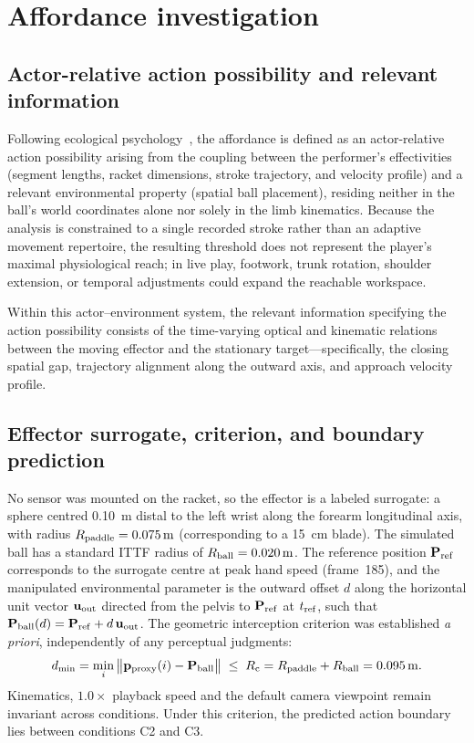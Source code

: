 \section{Affordance investigation}\label{sec:affordance}

\subsection{Actor-relative action possibility and relevant information}

Following ecological psychology~\cite{gibson1979}, the affordance is defined as an actor-relative action possibility arising from the coupling between the performer's effectivities (segment lengths, racket dimensions, stroke trajectory, and velocity profile) and a relevant environmental property (spatial ball placement), residing neither in the ball's world coordinates alone nor solely in the limb kinematics. Because the analysis is constrained to a single recorded stroke rather than an adaptive movement repertoire, the resulting threshold does not represent the player's maximal physiological reach; in live play, footwork, trunk rotation, shoulder extension, or temporal adjustments could expand the reachable workspace.

Within this actor--environment system, the relevant information specifying the action possibility consists of the time-varying optical and kinematic relations between the moving effector and the stationary target—specifically, the closing spatial gap, trajectory alignment along the outward axis, and approach velocity profile.

\subsection{Effector surrogate, criterion, and boundary prediction}
No sensor was mounted on the racket, so the effector is a labeled surrogate: a sphere centred \SI{0.10}{\meter} distal to the left wrist along the forearm longitudinal axis, with radius $R_{\mathrm{paddle}}=\SI{0.075}{\meter}$ (corresponding to a \SI{15}{\centi\meter} blade). The simulated ball has a standard ITTF radius of $R_{\mathrm{ball}}=\SI{0.020}{\meter}$. The reference position $\mathbf{P}_{\mathrm{ref}}$ corresponds to the surrogate centre at peak hand speed (frame~185), and the manipulated environmental parameter is the outward offset $d$ along the horizontal unit vector $\mathbf{u}_{\mathrm{out}}$ directed from the pelvis to $\mathbf{P}_{\mathrm{ref}}$ at $t_{\mathrm{ref}}$, such that $\mathbf{P}_{\mathrm{ball}}(d)=\mathbf{P}_{\mathrm{ref}}+d\,\mathbf{u}_{\mathrm{out}}$. The geometric interception criterion was established \emph{a priori}, independently of any perceptual judgments:
\begin{equation}
    d_{\mathrm{min}}=\min_i\,\bigl\lVert \mathbf{p}_{\mathrm{proxy}}(i)-\mathbf{P}_{\mathrm{ball}}\bigr\rVert \;\le\; R_{\mathrm{c}}=R_{\mathrm{paddle}}+R_{\mathrm{ball}}=\SI{0.095}{\meter}.
    \label{eq:criterion}
\end{equation}
Kinematics, $1.0\times$ playback speed and the default camera viewpoint remain invariant across conditions. Under this criterion, the predicted action boundary lies between conditions C2 and C3.

